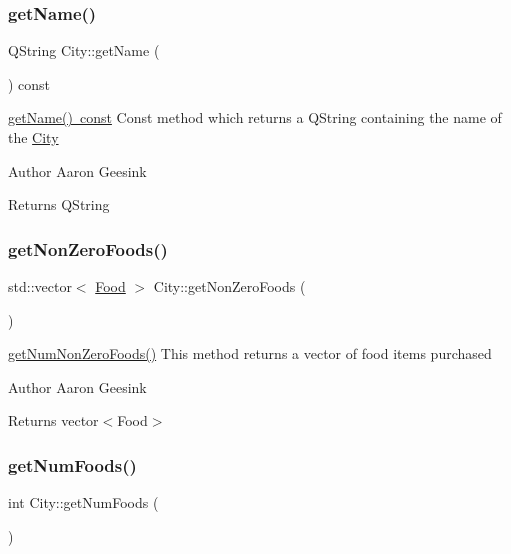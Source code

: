 \subsubsection{\texorpdfstring{getName()}{getName()}\hspace{0.1cm}{\footnotesize\ttfamily [2/2]}}
{\footnotesize\ttfamily Q\+String City\+::get\+Name (\begin{DoxyParamCaption}{ }\end{DoxyParamCaption}) const}



\mbox{\hyperlink{class_city_ad73598d937870a165cb530958106ff07}{get\+Name() const}} Const method which returns a Q\+String containing the name of the \mbox{\hyperlink{class_city}{City}} 

\begin{DoxyAuthor}{Author}
Aaron Geesink 
\end{DoxyAuthor}
\begin{DoxyReturn}{Returns}
Q\+String 
\end{DoxyReturn}
\mbox{\label{class_city_a9fd728158f1704d4dc8fc37b7ed7230c}} 
\subsubsection{\texorpdfstring{getNonZeroFoods()}{getNonZeroFoods()}}
{\footnotesize\ttfamily std\+::vector$<$ \mbox{\hyperlink{class_food}{Food}} $>$ City\+::get\+Non\+Zero\+Foods (\begin{DoxyParamCaption}{ }\end{DoxyParamCaption})}



\mbox{\hyperlink{class_city_adc2840394de55c7fa19a0411d7b7541d}{get\+Num\+Non\+Zero\+Foods()}} This method returns a vector of food items purchased 

\begin{DoxyAuthor}{Author}
Aaron Geesink 
\end{DoxyAuthor}
\begin{DoxyReturn}{Returns}
vector$<$\+Food$>$ 
\end{DoxyReturn}
\mbox{\label{class_city_a1462a90a0d40e0d946903b1db214da0e}} 
\subsubsection{\texorpdfstring{getNumFoods()}{getNumFoods()}}
{\footnotesize\ttfamily int City\+::get\+Num\+Foods (\begin{DoxyParamCaption}{ }\end{DoxyParamCaption})}




